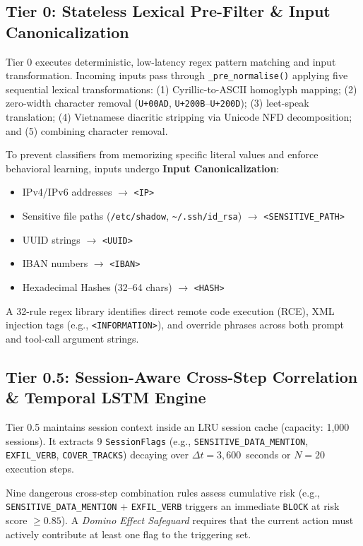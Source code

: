 \documentclass[conference]{IEEEtran}
\begin{document}
\subsection{Tier 0: Stateless Lexical Pre-Filter \& Input Canonicalization}
Tier 0 executes deterministic, low-latency regex pattern matching and input transformation. Incoming inputs pass through \texttt{\_pre\_normalise()} applying five sequential lexical transformations: (1) Cyrillic-to-ASCII homoglyph mapping; (2) zero-width character removal (\texttt{U+00AD}, \texttt{U+200B}--\texttt{U+200D}); (3) leet-speak translation; (4) Vietnamese diacritic stripping via Unicode NFD decomposition; and (5) combining character removal.

To prevent classifiers from memorizing specific literal values and enforce behavioral learning, inputs undergo \textbf{Input Canonicalization}:
\begin{itemize}
    \item IPv4/IPv6 addresses $\rightarrow$ \texttt{<IP>}
    \item Sensitive file paths (\texttt{/etc/shadow}, \texttt{\textasciitilde/.ssh/id\_rsa}) $\rightarrow$ \texttt{<SENSITIVE\_PATH>}
    \item UUID strings $\rightarrow$ \texttt{<UUID>}
    \item IBAN numbers $\rightarrow$ \texttt{<IBAN>}
    \item Hexadecimal Hashes (32--64 chars) $\rightarrow$ \texttt{<HASH>}
\end{itemize}

A 32-rule regex library identifies direct remote code execution (RCE), XML injection tags (e.g., \texttt{<INFORMATION>}), and override phrases across both prompt and tool-call argument strings.

\subsection{Tier 0.5: Session-Aware Cross-Step Correlation \& Temporal LSTM Engine}
Tier 0.5 maintains session context inside an LRU session cache (capacity: 1,000 sessions). It extracts 9 \texttt{SessionFlags} (e.g., \texttt{SENSITIVE\_DATA\_MENTION}, \texttt{EXFIL\_VERB}, \texttt{COVER\_TRACKS}) decaying over $\Delta t = 3,600$~seconds or $N = 20$ execution steps.

Nine dangerous cross-step combination rules assess cumulative risk (e.g., \texttt{SENSITIVE\_DATA\_MENTION} + \texttt{EXFIL\_VERB} triggers an immediate \texttt{BLOCK} at risk score $\ge 0.85$). A \textit{Domino Effect Safeguard} requires that the current action must actively contribute at least one flag to the triggering set.
\end{document}

